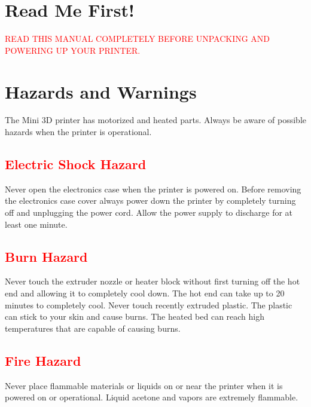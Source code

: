 %
%
%
%
%

\section{Read Me First!}
\textcolor{red}{READ THIS MANUAL COMPLETELY BEFORE UNPACKING AND POWERING UP YOUR PRINTER.}

\section{Hazards and Warnings}

The Mini 3D printer has motorized and heated parts.  Always be aware of possible hazards when the printer is operational.

\subsection{\textcolor{red}{Electric Shock Hazard}}
Never open the electronics case when the printer is powered on. Before removing the electronics case cover always power down the printer by completely turning off and unplugging the power cord. Allow the power supply to discharge for at least one minute.

\subsection{\textcolor{red}{Burn Hazard}}
Never touch the extruder nozzle or heater block without first turning off the hot end and allowing it to completely cool down. The hot end can take up to 20 minutes to completely cool. Never touch recently extruded plastic. The plastic can stick to your skin and cause burns. The heated bed can reach high temperatures that are capable of causing burns.

\subsection{\textcolor{red}{Fire Hazard}}
Never place flammable materials or liquids on or near the printer when it is powered on or operational. Liquid acetone and vapors are extremely flammable.

